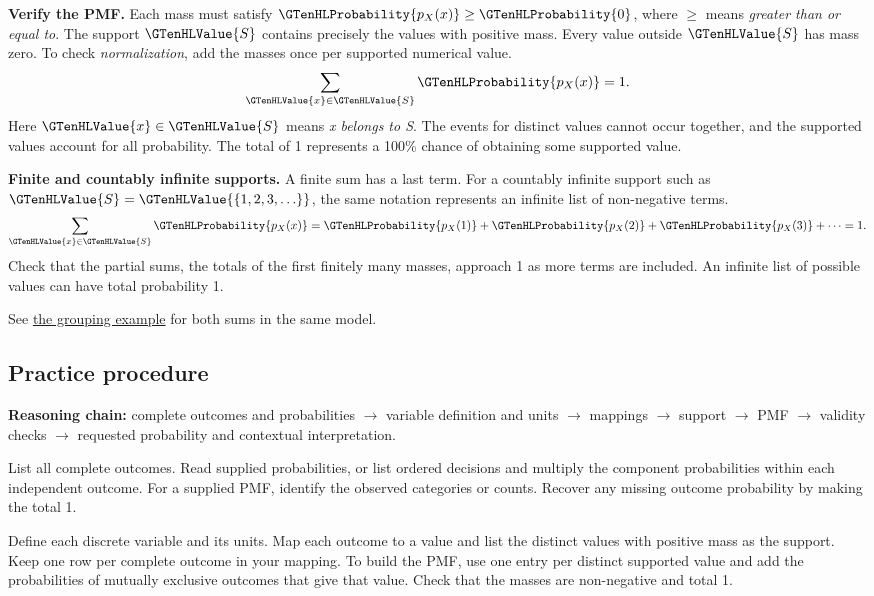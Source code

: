 \textbf{Verify the PMF.} Each mass must satisfy $\GTenHLProbability{p_{X}(x)}\geq\GTenHLProbability{0}$, where $\geq$ means \emph{greater than or equal to}. The support $\GTenHLValue{S}$ contains precisely the values with positive mass. Every value outside $\GTenHLValue{S}$ has mass zero. To check \emph{normalization}, add the masses once per supported numerical value.
\[
\sum_{\GTenHLValue{x}\in\GTenHLValue{S}}\GTenHLProbability{p_{X}(x)}=1.
\]
Here $\GTenHLValue{x}\in\GTenHLValue{S}$ means \emph{x belongs to S}. The events for distinct values cannot occur together, and the supported values account for all probability. The total of 1 represents a 100\% chance of obtaining some supported value.

\textbf{Finite and countably infinite supports.} A finite sum has a last term. For a countably infinite support such as $\GTenHLValue{S}=\GTenHLValue{\{1,2,3,\ldots\}}$, the same notation represents an infinite list of non-negative terms.
\[
\sum_{\GTenHLValue{x}\in\GTenHLValue{S}}\GTenHLProbability{p_{X}(x)}=\GTenHLProbability{p_{X}(1)}+\GTenHLProbability{p_{X}(2)}+\GTenHLProbability{p_{X}(3)}+\cdots=1.
\]
Check that the partial sums, the totals of the first finitely many masses, approach 1 as more terms are included. An infinite list of possible values can have total probability 1.

See \hyperref[subsec:t2-c1-introductory-general-problem-grouping-outcomes]{the grouping example} for both sums in the same model.


\subsection{Practice procedure}
\label{subsec:t2-c1-practice-procedure}

\textbf{Reasoning chain:} complete outcomes and probabilities $\to$ variable definition and units $\to$ mappings $\to$ support $\to$ PMF $\to$ validity checks $\to$ requested probability and contextual interpretation.

\noindent{} List all complete outcomes. Read supplied probabilities, or list ordered decisions and multiply the component probabilities within each independent outcome. For a supplied PMF, identify the observed categories or counts. Recover any missing outcome probability by making the total 1.

\noindent{} Define each discrete variable and its units. Map each outcome to a value and list the distinct values with positive mass as the support. Keep one row per complete outcome in your mapping. To build the PMF, use one entry per distinct supported value and add the probabilities of mutually exclusive outcomes that give that value. Check that the masses are non-negative and total 1.

